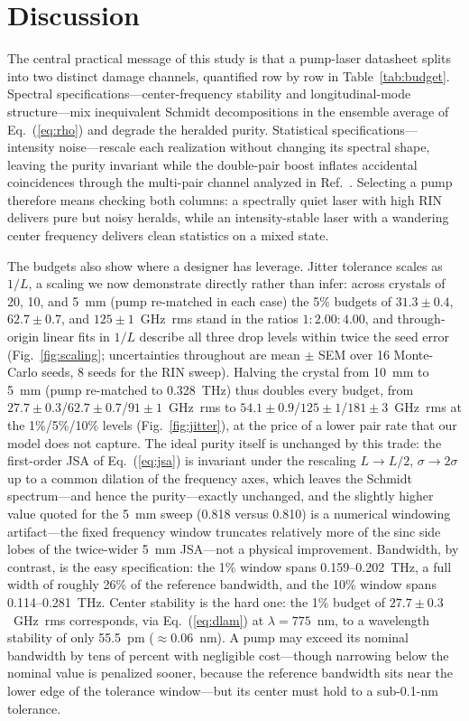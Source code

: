 \section{Discussion}
\label{sec:discussion}

The central practical message of this study is that a pump-laser
datasheet splits into two distinct damage channels, quantified row by
row in Table~\ref{tab:budget}. Spectral specifications---center-frequency
stability and longitudinal-mode structure---mix inequivalent Schmidt
decompositions in the ensemble average of Eq.~(\ref{eq:rho}) and
degrade the heralded purity. Statistical specifications---intensity
noise---rescale each realization without changing its spectral shape,
leaving the purity invariant while the double-pair boost inflates
accidental coincidences through the multi-pair channel analyzed in
Ref.~\cite{takeoka2015}. Selecting a pump therefore means checking
both columns: a spectrally quiet laser with high RIN delivers pure but
noisy heralds, while an intensity-stable laser with a wandering center
frequency delivers clean statistics on a mixed state.

The budgets also show where a designer has leverage. Jitter tolerance
scales as $1/L$, a scaling we now demonstrate directly rather than
infer: across crystals of 20, 10, and 5~mm (pump re-matched in each
case) the 5\% budgets of $31.3 \pm 0.4$, $62.7 \pm 0.7$, and
$125 \pm 1$~GHz~rms stand in the ratios $1:2.00:4.00$, and
through-origin linear fits in $1/L$ describe all three drop levels
within twice the seed error (Fig.~\ref{fig:scaling}; uncertainties
throughout are mean $\pm$ SEM over 16 Monte-Carlo seeds, 8 seeds for
the RIN sweep). Halving the
crystal from 10~mm to 5~mm (pump re-matched to 0.328~THz) thus
doubles every budget, from
$27.7 \pm 0.3$/$62.7 \pm 0.7$/$91 \pm 1$~GHz~rms to
$54.1 \pm 0.9$/$125 \pm 1$/$181 \pm 3$~GHz~rms at the 1\%/5\%/10\%
levels (Fig.~\ref{fig:jitter}), at the price of a lower pair rate
that our model does not capture. The ideal purity itself is unchanged by this
trade: the first-order JSA of Eq.~(\ref{eq:jsa}) is invariant under
the rescaling $L \to L/2$, $\sigma \to 2\sigma$ up to a common
dilation of the frequency axes, which leaves the Schmidt
spectrum---and hence the purity---exactly unchanged, and the
slightly higher value quoted for the 5~mm sweep (0.818 versus 0.810)
is a numerical windowing artifact---the fixed frequency window
truncates relatively more of the sinc side lobes of the twice-wider
5~mm JSA---not a physical improvement. Bandwidth, by contrast, is the easy specification:
the 1\% window spans 0.159--0.202~THz, a full width of roughly 26\% of
the reference bandwidth, and the 10\% window spans 0.114--0.281~THz.
Center stability is the hard one: the 1\% budget of
$27.7 \pm 0.3$~GHz~rms corresponds, via Eq.~(\ref{eq:dlam}) at
$\lambda = 775$~nm, to a wavelength stability of only 55.5~pm
($\approx 0.06$~nm). A pump may exceed its nominal bandwidth by tens
of percent with negligible cost---though narrowing below the nominal
value is penalized sooner, because the reference bandwidth sits near
the lower edge of the tolerance window---but its center must hold to
a sub-0.1-nm tolerance.


